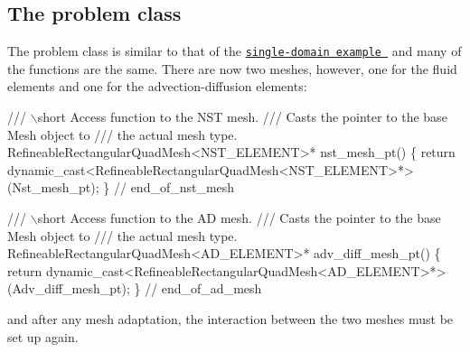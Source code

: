 \hypertarget{index_problem_class}{}\subsection{The problem class}\label{index_problem_class}
The problem class is similar to that of the \href{../../refine_b_convect/html/index.html}{\tt single-\/domain example } and many of the functions are the same. There are now two meshes, however, one for the fluid elements and one for the advection-\/diffusion elements\+:

 
\begin{DoxyCodeInclude}
 \textcolor{comment}{/// \(\backslash\)short Access function to the NST mesh. }
\textcolor{comment}{ /// Casts the pointer to the base Mesh object to }
\textcolor{comment}{}\textcolor{comment}{ /// the actual mesh type.}
\textcolor{comment}{} RefineableRectangularQuadMesh<NST\_ELEMENT>* nst\_mesh\_pt() 
  \{
   \textcolor{keywordflow}{return} \textcolor{keyword}{dynamic\_cast<}RefineableRectangularQuadMesh<NST\_ELEMENT>*\textcolor{keyword}{>}
    (Nst\_mesh\_pt);
  \} \textcolor{comment}{// end\_of\_nst\_mesh}

\end{DoxyCodeInclude}



\begin{DoxyCodeInclude}
 \textcolor{comment}{/// \(\backslash\)short Access function to the AD mesh. }
\textcolor{comment}{ /// Casts the pointer to the base Mesh object to }
\textcolor{comment}{}\textcolor{comment}{ /// the actual mesh type.}
\textcolor{comment}{} RefineableRectangularQuadMesh<AD\_ELEMENT>* adv\_diff\_mesh\_pt() 
  \{
   \textcolor{keywordflow}{return} \textcolor{keyword}{dynamic\_cast<}RefineableRectangularQuadMesh<AD\_ELEMENT>*\textcolor{keyword}{>}
    (Adv\_diff\_mesh\_pt);
  \} \textcolor{comment}{// end\_of\_ad\_mesh}

\end{DoxyCodeInclude}


and after any mesh adaptation, the interaction between the two meshes must be set up again.


